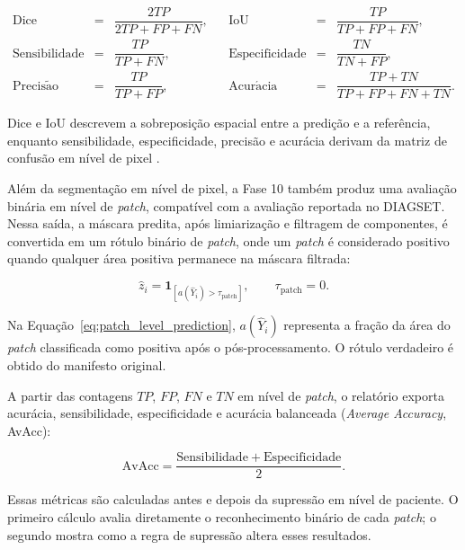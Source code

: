 \begin{equation}
\begin{array}{rclcrcl}
    \mathrm{Dice} &=& \dfrac{2TP}{2TP+FP+FN},
    &&
    \mathrm{IoU} &=& \dfrac{TP}{TP+FP+FN},\\[0.8em]
    \mathrm{Sensibilidade} &=& \dfrac{TP}{TP+FN},
    &&
    \mathrm{Especificidade} &=& \dfrac{TN}{TN+FP},\\[0.8em]
    \mathrm{Precis\tilde{a}o} &=& \dfrac{TP}{TP+FP},
    &&
    \mathrm{Acur\acute{a}cia} &=& \dfrac{TP+TN}{TP+FP+FN+TN}.
\end{array}
\label{eq:metricas_finais}
\end{equation}

Dice e IoU descrevem a sobreposição espacial entre a predição e a referência,
enquanto sensibilidade, especificidade, precisão e acurácia derivam da matriz de
confusão em nível de pixel \cite{seghier2024dice,sokolova2009performance}. 


Além da segmentação em nível de pixel, a Fase 10 também produz uma avaliação
binária em nível de \textit{patch}, compatível com a avaliação reportada no
DIAGSET. Nessa saída, a máscara predita, após limiarização e filtragem de
componentes, é convertida em um rótulo binário de \textit{patch}, onde um \textit{patch} é considerado positivo quando qualquer área positiva permanece na máscara filtrada:

\begin{equation}
    \hat{z}_i =
    \mathbf{1}_{[a(\hat{Y}_i) > \tau_{\mathrm{patch}}]},
    \qquad \tau_{\mathrm{patch}}=0.
    \label{eq:patch_level_prediction}
\end{equation}

Na Equação~\ref{eq:patch_level_prediction}, $a(\hat{Y}_i)$ representa a fração
da área do \textit{patch} classificada como positiva após o pós-processamento.
O rótulo verdadeiro é obtido do manifesto original.

A partir das contagens $TP$, $FP$, $FN$ e $TN$ em nível de \textit{patch}, o
relatório exporta acurácia, sensibilidade, especificidade e acurácia balanceada
(\textit{Average Accuracy}, AvAcc):

\begin{equation}
    \mathrm{AvAcc} =
    \frac{\mathrm{Sensibilidade}+\mathrm{Especificidade}}{2}.
    \label{eq:patch_avacc}
\end{equation}

Essas métricas são calculadas antes e depois da supressão em nível de paciente.
O primeiro cálculo avalia diretamente o reconhecimento binário de cada
\textit{patch}; o segundo mostra como a regra de supressão altera esses
resultados.


